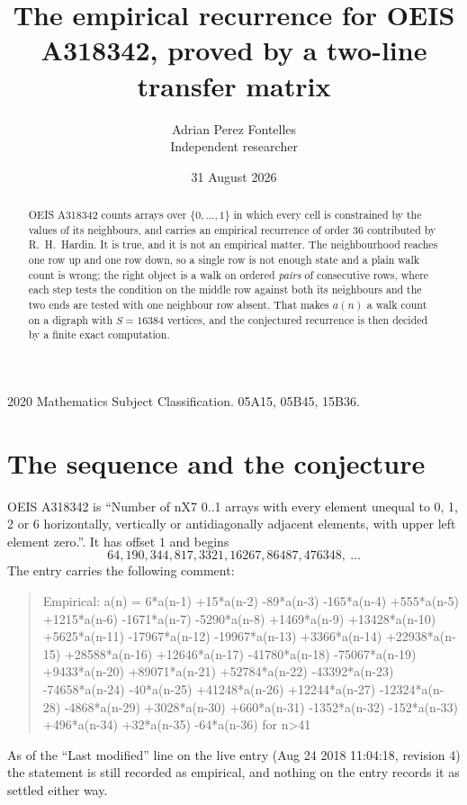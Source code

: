 \documentclass[11pt,a4paper]{article}
\title{The empirical recurrence for OEIS A318342, proved by a two-line transfer matrix}
\author{Adrian Perez Fontelles\\ \small Independent researcher}
\date{31 August 2026}
\theoremstyle{plain}
\theoremstyle{definition}
\begin{document}
\maketitle

\begin{abstract}
OEIS A318342 counts arrays over $\{0,\dots,1\}$ in which every cell is constrained by the
values of its neighbours, and carries an empirical recurrence of order $36$ contributed
by R.~H.~Hardin. It is true, and it is not an empirical matter. The neighbourhood reaches one
row up and one row down, so a single row is not enough state and a plain walk count
is wrong; the right object is a walk on ordered \emph{pairs} of consecutive rows, where
each step tests the condition on the middle row against both its neighbours and the two
ends are tested with one neighbour row absent. That makes $a(n)$ a walk count on a digraph
with $S=16384$ vertices, and the conjectured recurrence is then decided by a finite exact
computation.
\end{abstract}

\noindent\small 2020 Mathematics Subject Classification. 05A15, 05B45, 15B36.\normalsize

\section{The sequence and the conjecture}

OEIS A318342 is ``Number of nX7 0..1 arrays with every element unequal to 0, 1, 2 or 6 horizontally, vertically or antidiagonally adjacent elements, with upper left element zero.''. It has offset $1$ and begins
\[
64, 190, 344, 817, 3321, 16267, 86487, 476348,\ \dots
\]
The entry carries the following comment:
\begin{quote}\small
Empirical: a(n) = 6*a(n-1) +15*a(n-2) -89*a(n-3) -165*a(n-4) +555*a(n-5) +1215*a(n-6) -1671*a(n-7) -5290*a(n-8) +1469*a(n-9) +13428*a(n-10) +5625*a(n-11) -17967*a(n-12) -19967*a(n-13) +3366*a(n-14) +22938*a(n-15) +28588*a(n-16) +12646*a(n-17) -41780*a(n-18) -75067*a(n-19) +9433*a(n-20) +89071*a(n-21) +52784*a(n-22) -43392*a(n-23) -74658*a(n-24) -40*a(n-25) +41248*a(n-26) +12244*a(n-27) -12324*a(n-28) -4868*a(n-29) +3028*a(n-30) +660*a(n-31) -1352*a(n-32) -152*a(n-33) +496*a(n-34) +32*a(n-35) -64*a(n-36) for n>41
\end{quote}
As of the ``Last modified'' line on the live entry (Aug 24 2018 11:04:18, revision 4) the statement is
still recorded as empirical, and nothing on the entry records it as settled either way.
\end{document}
